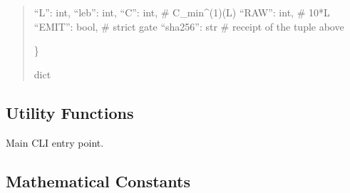 \documentclass[letterpaper,10pt,english]{sphinxmanual}
\begin{document}
\begin{fulllineitems}
\begin{quote}
\begin{description}
\begin{description}
\sphinxlineitem{\{}
\sphinxAtStartPar
“L”: int,
“leb”: int,
“C”: int,       \# C\_min\textasciicircum{}(1)(L)
“RAW”: int,     \# 10*L
“EMIT”: bool,   \# strict gate
“sha256”: str   \# receipt of the tuple above

\end{description}

\sphinxAtStartPar
\}

\sphinxAtStartPar
dict

\end{description}\end{quote}

\end{fulllineitems}



\subsection{Utility Functions}
\label{\detokenize{clf_calculator:utility-functions}}

\begin{fulllineitems}
\label{\detokenize{clf_calculator:id9}}
\pysigstartsignatures
\pysiglinewithargsret
{}
{}
{}
\pysigstopsignatures
\sphinxAtStartPar
Main CLI entry point.

\end{fulllineitems}



\subsection{Mathematical Constants}
\label{\detokenize{clf_calculator:mathematical-constants}}
\end{document}
